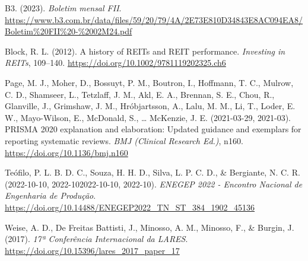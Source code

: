 \documentclass[
  12pt,
  letterpaper,
  DIV=11,
  numbers=noendperiod]{scrartcl}
\newlength{\cslhangindent}
\newenvironment{CSLReferences}[2] %
 {\begin{list}{}{%
  \setlength{\itemindent}{0pt}
  \setlength{\leftmargin}{0pt}
  \setlength{\parsep}{0pt}
  \ifodd #1
   \setlength{\leftmargin}{\cslhangindent}
   \setlength{\itemindent}{-1\cslhangindent}
  \fi
  \setlength{\itemsep}{#2\baselineskip}}}
 {\end{list}}
\begin{document}
\label{refs}
\begin{CSLReferences}{1}{0}
B3. (2023). \emph{Boletim mensal {FII}}.
\url{https://www.b3.com.br/data/files/59/20/79/4A/2E73E810D34843E8AC094EA8/Boletim\%20FII\%20-\%2002M24.pdf}

Block, R. L. (2012). A history of REITs and REIT performance.
\emph{Investing in REITs}, 109--140.
\url{https://doi.org/10.1002/9781119202325.ch6}

Page, M. J., Moher, D., Bossuyt, P. M., Boutron, I., Hoffmann, T. C.,
Mulrow, C. D., Shamseer, L., Tetzlaff, J. M., Akl, E. A., Brennan, S.
E., Chou, R., Glanville, J., Grimshaw, J. M., Hróbjartsson, A., Lalu, M.
M., Li, T., Loder, E. W., Mayo-Wilson, E., McDonald, S., \ldots{}
McKenzie, J. E. (2021-03-29, 2021-03). {PRISMA} 2020 explanation and
elaboration: Updated guidance and exemplars for reporting systematic
reviews. \emph{BMJ (Clinical Research Ed.)}, n160.
\url{https://doi.org/10.1136/bmj.n160}

Teófilo, P. L. B. D. C., Souza, H. H. D., Silva, L. P. C. D., \&
Bergiante, N. C. R. (2022-10-10, 2022-102022-10-10, 2022-10).
\emph{{ENEGEP 2022 - Encontro Nacional de Engenharia de Produ{ç}{ã}o}}.
\url{https://doi.org/10.14488/ENEGEP2022_TN_ST_384_1902_45136}

Weise, A. D., De Freitas Battisti, J., Minosso, A. M., Minosso, F., \&
Burgin, J. (2017). \emph{{17ª Confer{ê}ncia Internacional da LARES}}.
\url{https://doi.org/10.15396/lares_2017_paper_17}

\end{CSLReferences}
\end{document}
